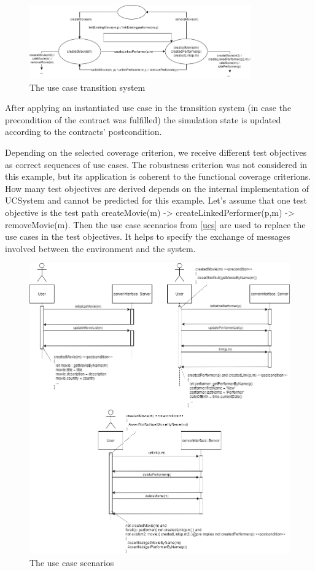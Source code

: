\begin{figure}[h]
	\centering
	\includegraphics[width=0.85\textwidth]{./images/ucts.png}
	\caption{The use case transition system}
	\label{ucts}
\end{figure}

After applying an instantiated use case in the transition system (in case the precondition of the contract was fulfilled) the simulation state is updated according to the contracts' postcondition. 

Depending on the selected coverage criterion, we receive different test objectives as correct sequences of use cases. The robustness criterion was not considered in this example, but its application is coherent to the functional coverage criterions. How many test objectives are derived depends on the internal implementation of UCSystem and cannot be predicted for this example. Let's assume that one test objective is the test path createMovie(m) \mbox{-\textgreater} createLinkedPerformer(p,m) \mbox{-\textgreater} removeMovie(m). Then the use case scenarios from \autoref{ucs} are used to replace the use cases in the test objectives. It helps to specify the exchange of messages involved between the environment and the system.

\begin{figure}[h]
	\centering
	\includegraphics[width=1.0\textwidth]{./images/ucs.png}
	\caption{The use case scenarios}
	\label{ucs}
\end{figure}

